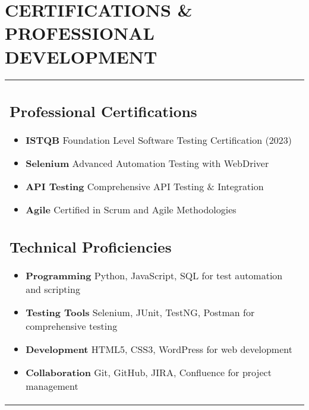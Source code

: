 \documentclass[11pt,a4paper]{article}
\newcommand{\achievement}[2]{\textbf{\textcolor{primary}{#1}} #2}
\begin{document}
\section*{CERTIFICATIONS \& PROFESSIONAL DEVELOPMENT}
\begin{tabularx}{\textwidth}{>{\raggedright\arraybackslash}X}
\subsection{Professional Certifications}
\begin{itemize}[leftmargin=*,nosep,itemsep=4pt]
\item \achievement{ISTQB}{Foundation Level Software Testing Certification (2023)}
\item \achievement{Selenium}{Advanced Automation Testing with WebDriver}
\item \achievement{API Testing}{Comprehensive API Testing \& Integration}
\item \achievement{Agile}{Certified in Scrum and Agile Methodologies}
\end{itemize}

\vspace{0.4cm}
\subsection{Technical Proficiencies}
\begin{itemize}[leftmargin=*,nosep,itemsep=4pt]
\item \achievement{Programming}{Python, JavaScript, SQL for test automation and scripting}
\item \achievement{Testing Tools}{Selenium, JUnit, TestNG, Postman for comprehensive testing}
\item \achievement{Development}{HTML5, CSS3, WordPress for web development}
\item \achievement{Collaboration}{Git, GitHub, JIRA, Confluence for project management}
\end{itemize}
\end{tabularx}
\end{document}
